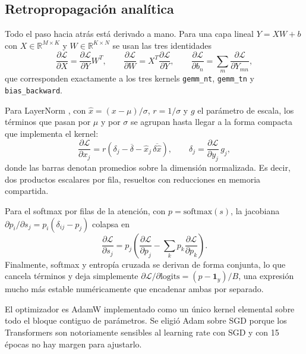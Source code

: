 \documentclass[11pt,a4paper]{article}
\begin{document}
\subsection{Retropropagación analítica}

Todo el paso hacia atrás está derivado a mano. Para una capa lineal
$Y = XW + b$ con $X \in \mathbb{R}^{M\times K}$ y $W \in \mathbb{R}^{K\times N}$
se usan las tres identidades
\begin{equation}
\frac{\partial \mathcal{L}}{\partial X} = \frac{\partial \mathcal{L}}{\partial Y} W^{T},
\qquad
\frac{\partial \mathcal{L}}{\partial W} = X^{T} \frac{\partial \mathcal{L}}{\partial Y},
\qquad
\frac{\partial \mathcal{L}}{\partial b_n} = \sum_{m} \frac{\partial \mathcal{L}}{\partial Y_{mn}} ,
\end{equation}
que corresponden exactamente a los tres kernels \texttt{gemm\_nt},
\texttt{gemm\_tn} y \texttt{bias\_backward}.

Para LayerNorm \cite{ba2016layer}, con $\hat{x} = (x-\mu)/\sigma$, $r = 1/\sigma$ y
$g$ el parámetro de escala, los términos que pasan por $\mu$ y por $\sigma$ se
agrupan hasta llegar a la forma compacta que implementa el kernel:
\begin{equation}
\frac{\partial \mathcal{L}}{\partial x_j}
  = r\left(\delta_j - \overline{\delta} - \hat{x}_j\,\overline{\delta\hat{x}}\right),
  \qquad \delta_j = \frac{\partial \mathcal{L}}{\partial y_j}\, g_j ,
\end{equation}
donde las barras denotan promedios sobre la dimensión normalizada. Es decir,
dos productos escalares por fila, resueltos con reducciones en memoria
compartida.

Para el softmax por filas de la atención, con $p = \mathrm{softmax}(s)$, la
jacobiana $\partial p_i/\partial s_j = p_i(\delta_{ij}-p_j)$ colapsa en
\begin{equation}
\frac{\partial \mathcal{L}}{\partial s_j}
  = p_j\left(\frac{\partial \mathcal{L}}{\partial p_j}
    - \sum_k p_k \frac{\partial \mathcal{L}}{\partial p_k}\right).
\end{equation}
Finalmente, softmax y entropía cruzada se derivan de forma conjunta, lo que
cancela términos y deja simplemente
$\partial \mathcal{L}/\partial \text{logits} = (p - \mathbf{1}_y)/B$, una
expresión mucho más estable numéricamente que encadenar ambas por separado.

El optimizador es AdamW \cite{loshchilov2019decoupled} implementado como un
único kernel elemental sobre todo el bloque contiguo de parámetros. Se eligió
Adam sobre SGD porque los Transformers son notoriamente sensibles al learning
rate con SGD y con 15 épocas no hay margen para ajustarlo.
\end{document}
